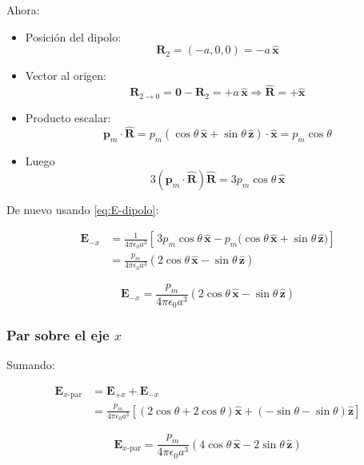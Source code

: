 \documentclass{article}
\begin{document}
Ahora:

\begin{itemize}
  \item Posición del dipolo:
    \[
    \mathbf{R}_{2} = (-a,0,0) = -a\,\hat{\mathbf{x}}
    \]
  \item Vector al origen:
    \[
    \mathbf{R}_{2\to 0} = \mathbf{0} - \mathbf{R}_{2}
    = +a\,\hat{\mathbf{x}}
    \Rightarrow \hat{\mathbf{R}} = +\hat{\mathbf{x}}
    \]
  \item Producto escalar:
    \[
    \mathbf{p}_{m}\cdot\hat{\mathbf{R}}
    = p_{m}(\cos\theta\,\hat{\mathbf{x}} + \sin\theta\,\hat{\mathbf{z}})
            \cdot\hat{\mathbf{x}}
    = p_{m}\cos\theta
    \]
  \item Luego
    \[
    3(\mathbf{p}_{m}\cdot\hat{\mathbf{R}})\hat{\mathbf{R}}
    = 3p_{m}\cos\theta\,\hat{\mathbf{x}}
    \]
\end{itemize}

De nuevo usando \eqref{eq:E-dipolo}:

\begin{align}
\mathbf{E}_{-x}
&= \frac{1}{4\pi\epsilon_{0}a^{3}}
\left[\,3p_{m}\cos\theta\,\hat{\mathbf{x}}
       - p_{m}\bigl(\cos\theta\,\hat{\mathbf{x}}
                   + \sin\theta\,\hat{\mathbf{z}}\bigr)\right]\\[4pt]
&= \frac{p_{m}}{4\pi\epsilon_{0}a^{3}}
\left(2\cos\theta\,\hat{\mathbf{x}} - \sin\theta\,\hat{\mathbf{z}}\right)
\end{align}

\begin{equation}
\boxed{
\mathbf{E}_{-x}
= \frac{p_{m}}{4\pi\epsilon_{0}a^{3}}
  \left(2\cos\theta\,\hat{\mathbf{x}} - \sin\theta\,\hat{\mathbf{z}}\right)
}
\label{eq:Ex-menos}
\end{equation}

\subsubsection*{Par sobre el eje $x$}

Sumando:

\begin{align}
\mathbf{E}_{x\text{-par}}
&= \mathbf{E}_{+x} + \mathbf{E}_{-x}\\[4pt]
&= \frac{p_{m}}{4\pi\epsilon_{0}a^{3}}
\left[(2\cos\theta + 2\cos\theta)\hat{\mathbf{x}}
      +(-\sin\theta - \sin\theta)\hat{\mathbf{z}}\right]
\end{align}

\begin{equation}
\boxed{
\mathbf{E}_{x\text{-par}}
= \frac{p_{m}}{4\pi\epsilon_{0}a^{3}}
  \left(4\cos\theta\,\hat{\mathbf{x}}
       - 2\sin\theta\,\hat{\mathbf{z}}\right)
}
\label{eq:Ex-par}
\end{equation}
\end{document}
